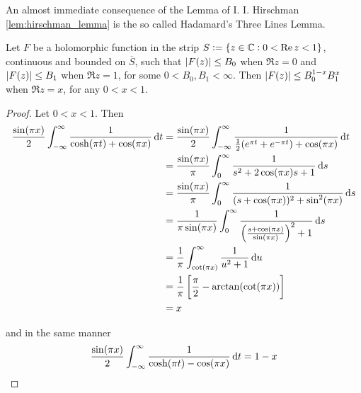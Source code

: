 An almost immediate consequence of the Lemma of I. I. Hirschman \ref{lem:hirschman_lemma} is the so called Hadamard's Three Lines Lemma.

\begin{lemma}
	Let $F$ be a holomorphic function in the strip $S := \cbr[0]{ z \in \mathbb{C}: 0 < \Re z < 1}$, continuous and bounded on $\overline{S}$, such that $\abs[0]{F(z)} \leq B_0$ when $\Re z = 0$ and $\abs[0]{F(z)} \leq B_1$ when $\Re z = 1$, for some $0 < B_0,B_1 < \infty$. Then $\abs[0]{F(z)}\leq B_0^{1 - x}B_1^x$ when $\Re z = x$, for any $0 < x < 1$.
	\label{lem:hadamards_three_lines_lemma}
\end{lemma}

\begin{proof}
Let $0 < x < 1$. Then
	\begin{equation*}
		\begin{aligned}
			\frac{\sin( \pi x )}{2} \int_{-\infty}^\infty \frac{1}{\cosh(\pi t ) + \cos( \pi x )} \d t &= \frac{\sin( \pi x )}{2} \int_{-\infty}^\infty \frac{1}{\frac{1}{2}( e^{\pi t} + e^{-\pi t} ) + \cos( \pi x )} \d t\\
			&= \frac{\sin( \pi x )}{\pi} \int_{0}^\infty \frac{1}{s^2 + 2\cos( \pi x )s + 1} \d s\\
			&= \frac{\sin( \pi x )}{\pi} \int_{0}^\infty \frac{1}{( s + \cos( \pi x ) )^2 + \sin^2( \pi x )} \d s\\
			&= \frac{1}{\pi\sin( \pi x )} \int_{0}^\infty \frac{1}{\del{ \frac{s + \cos( \pi x )}{\sin( \pi x )}}^2 + 1} \d s\\
			&= \frac{1}{\pi} \int_{\cot( \pi x )}^\infty \frac{1}{u^2 + 1} \d u\\
			&= \frac{1}{\pi}\sbr{ \frac{\pi}{2} - \arctan( \cot( \pi x )) }\\
			&= x
		\end{aligned}
	\end{equation*}

	\noindent and in the same manner
	\begin{equation*}
		\frac{\sin( \pi x )}{2} \int_{-\infty}^\infty \frac{1}{\cosh( \pi t ) - \cos( \pi x )} \mathop{}\!\mathrm{d} t = 1 - x	
	\end{equation*}


\end{proof}

